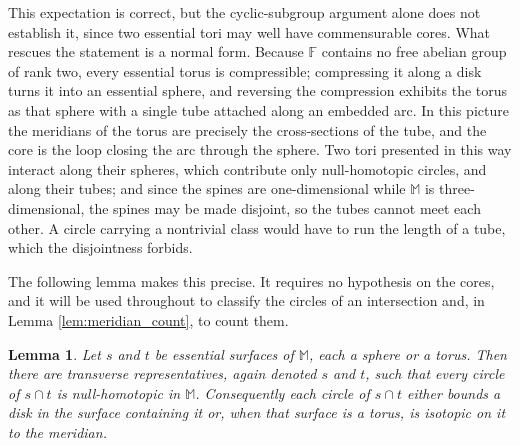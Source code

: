 \documentclass[12pt,a4paper]{amsart}
\numberwithin{equation}{section}
\newcommand{\FF}{\mathbb{F}}
\newcommand{\MM}{\mathbb{M}}
\theoremstyle{plain}
\newtheorem{lemma}[theorem]{Lemma}
\theoremstyle{definition}
\theoremstyle{remark}
\begin{document}
This expectation is correct, but the cyclic-subgroup argument alone does not establish it, since two essential tori may well have commensurable cores.
What rescues the statement is a normal form.
Because $\FF$ contains no free abelian group of rank two, every essential torus is compressible; compressing it along a disk turns it into an essential sphere, and reversing the compression exhibits the torus as that sphere with a single tube attached along an embedded arc.
In this picture the meridians of the torus are precisely the cross-sections of the tube, and the core is the loop closing the arc through the sphere.
Two tori presented in this way interact along their spheres, which contribute only null-homotopic circles, and along their tubes; and since the spines are one-dimensional while $\MM$ is three-dimensional, the spines may be made disjoint, so the tubes cannot meet each other.
A circle carrying a nontrivial class would have to run the length of a tube, which the disjointness forbids.

The following lemma makes this precise.
It requires no hypothesis on the cores, and it will be used throughout to classify the circles of an intersection and, in Lemma \ref{lem:meridian_count}, to count them.

\begin{lemma} \label{lem:circle_types}
    Let $s$ and $t$ be essential surfaces of $\MM$, each a sphere or a torus.
    Then there are transverse representatives, again denoted $s$ and $t$, such that every circle of $s \cap t$ is null-homotopic in $\MM$.
    Consequently each circle of $s \cap t$ either bounds a disk in the surface containing it or, when that surface is a torus, is isotopic on it to the meridian.
\end{lemma}
\end{document}
